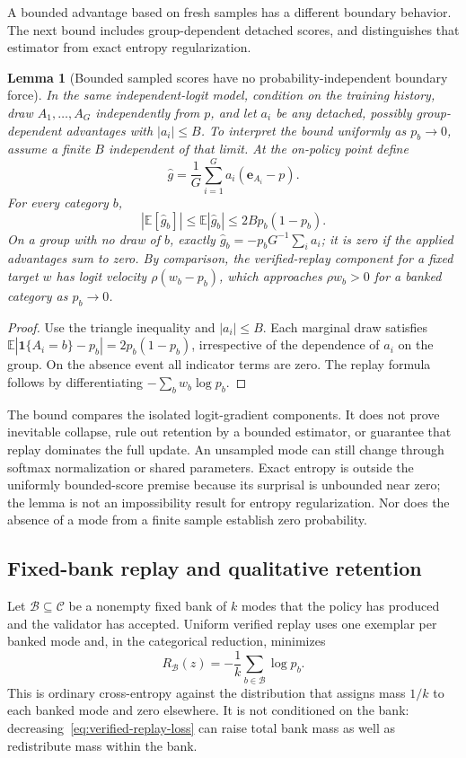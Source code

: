 \documentclass{article}
\newcommand{\1}{\mathbf 1}
\newcommand{\E}{\mathbb E}
\newtheorem{lemma}{Lemma}[section]
\theoremstyle{remark}
\theoremstyle{definition}
\theoremstyle{plain}
\begin{document}
A bounded advantage based on fresh samples has a different boundary behavior.
The next bound includes group-dependent detached scores, and distinguishes
that estimator from exact entropy regularization.

\begin{lemma}[Bounded sampled scores have no probability-independent boundary force]
\label{lem:sampled-score-bound}
In the same independent-logit model, condition on the training history, draw
$A_1,\ldots,A_G$ independently from $p$, and let $a_i$ be any detached,
possibly group-dependent advantages with $|a_i|\le B$. To interpret the
bound uniformly as $p_b\to0$, assume a finite $B$ independent of that limit.
At the on-policy point define
\[
 \widehat g=\frac1G\sum_{i=1}^G a_i(\mathbf e_{A_i}-p).
\]
For every category $b$,
\[
 |\E[\widehat g_b]|\le\E|\widehat g_b|
 \le 2B p_b(1-p_b).
\]
On a group with no draw of $b$, exactly
$\widehat g_b=-p_bG^{-1}\sum_i a_i$; it is zero if the applied advantages
sum to zero. By comparison, the verified-replay component for a fixed target
$w$ has logit velocity $\rho(w_b-p_b)$, which approaches $\rho w_b>0$
for a banked category as $p_b\to0$.
\end{lemma}

\begin{proof}
Use the triangle inequality and $|a_i|\le B$. Each marginal draw satisfies
$\E|\1\{A_i=b\}-p_b|=2p_b(1-p_b)$, irrespective of the dependence of
$a_i$ on the group. On the absence event all indicator terms are zero.
The replay formula follows by differentiating $-\sum_b w_b\log p_b$.
\end{proof}

The bound compares the isolated logit-gradient components. It does not prove
inevitable collapse, rule out retention by a bounded estimator, or guarantee
that replay dominates the full update. An unsampled mode can still change
through softmax normalization or shared parameters. Exact entropy is outside
the uniformly bounded-score premise because its surprisal is unbounded near
zero; the lemma is not an impossibility result for entropy regularization.
Nor does the absence of a mode from a finite sample establish zero probability.


\subsection{Fixed-bank replay and qualitative retention}
\label{app:theory-replay}

Let $\mathcal B\subseteq\mathcal C$ be a nonempty fixed bank of $k$ modes that
the policy has produced and the validator has accepted. Uniform verified replay
uses one exemplar per banked mode and, in the categorical reduction, minimizes
\begin{equation}
  R_{\mathcal B}(z)
  =-\frac1k\sum_{b\in\mathcal B}\log p_b.
  \label{eq:verified-replay-loss}
\end{equation}
This is ordinary cross-entropy against the distribution that assigns mass
$1/k$ to each banked mode and zero elsewhere. It is not conditioned on the
bank: decreasing~\eqref{eq:verified-replay-loss} can raise total bank mass as
well as redistribute mass within the bank.
\end{document}
